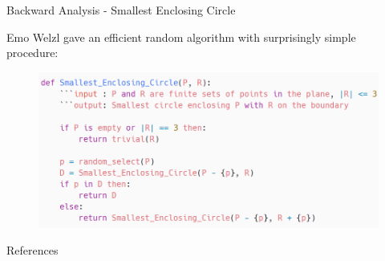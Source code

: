 \documentclass{beamer}
\newcommand{\lf}{\left[}
\newcommand{\rf}{\right]}
\begin{document}
\begin{frame}{Backward Analysis - Smallest Enclosing Circle}

	Emo Welzl gave an efficient random algorithm with surprisingly simple procedure:

	\begin{figure}[h]
		\includegraphics[width=1.0\linewidth]{pics/smallest_enclosing_circle_psudocode.png}
	\end{figure}







\end{frame}

\begin{frame}[allowframebreaks]{References}
	
\end{frame}
\end{document}

